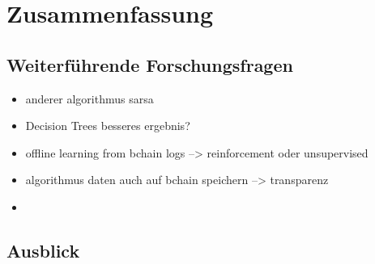 \chapter{Zusammenfassung}
\label{kap:Kapitel05}
%
\section{Weiterf\"uhrende Forschungsfragen}
%
\begin{itemize}
    \item anderer algorithmus sarsa
    \item Decision Trees besseres ergebnis?
    \item offline learning from bchain logs --> reinforcement oder unsupervised
    \item algorithmus daten auch auf bchain speichern --> transparenz
    \item 
\end{itemize}
%
\section{Ausblick}
%

%
